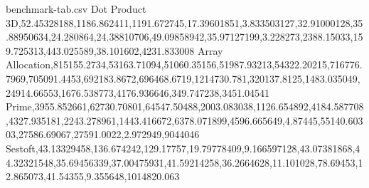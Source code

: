 \begin{filecontents*}{benchmark-tab.csv}
Dot Product 3D,52.45328188,1186.862411,1191.672745,17.39601851,3.833503127,32.91000128,35.88950634,24.280864,24.38810706,49.09858942,35.97127199,3.228273,2388.15033,159.725313,443.025589,38.101602,4231.833008
Array Allocation,815155.2734,53163.71094,51060.35156,51987.93213,54322.20215,716776.7969,705091.4453,692183.8672,696468.6719,1214730.781,320137.8125,1483.035049,24914.66553,1676.538773,4176.936646,349.747238,3451.04541
Prime,3955.852661,62730.70801,64547.50488,2003.083038,1126.654892,4184.587708,4327.935181,2243.278961,1443.416672,6378.071899,4596.665649,4.87445,55140.60303,27586.69067,27591.0022,2.972949,9044046
Sestoft,43.13329458,136.674242,129.17757,19.79778409,9.166597128,43.07381868,44.32321548,35.69456339,37.00475931,41.59214258,36.2664628,11.101028,78.69453,12.865073,41.54355,9.355648,1014820.063
\end{filecontents*}

